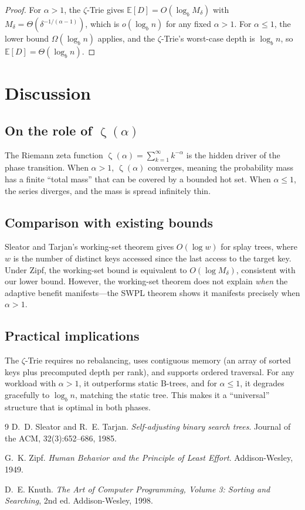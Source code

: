 \documentclass[11pt]{article}
\newcommand{\E}{\mathbb{E}}
\DeclareMathOperator{\Zeta}{\zeta}
\begin{document}
\begin{proof}
For $\alpha>1$, the $\zeta$-Trie gives $\E[D] = O(\log_b M_δ)$ with
$M_δ = Θ(δ^{-1/(\alpha-1)})$, which is $o(\log_b n)$ for any fixed $α>1$.
For $\alpha\le1$, the lower bound $\Omega(\log_b n)$ applies, and the
$\zeta$-Trie's worst-case depth is $\log_b n$, so
$\E[D] = \Theta(\log_b n)$.
\end{proof}

\section{Discussion}

\subsection{On the role of $\Zeta(\alpha)$}

The Riemann zeta function $\Zeta(\alpha) = \sum_{k=1}^\infty k^{-\alpha}$ is
the hidden driver of the phase transition.  When $\alpha>1$, $\Zeta(\alpha)$
converges, meaning the probability mass has a finite ``total mass'' that can
be covered by a bounded hot set.  When $\alpha\le1$, the series diverges,
and the mass is spread infinitely thin.

\subsection{Comparison with existing bounds}

Sleator and Tarjan's working-set theorem \cite{sleator85} gives
$O(\log w)$ for splay trees, where $w$ is the number of distinct keys
accessed since the last access to the target key.  Under Zipf, the
working-set bound is equivalent to $O(\log M_δ)$, consistent with our
lower bound.  However, the working-set theorem does not explain
\emph{when} the adaptive benefit manifests---the SWPL theorem shows
it manifests precisely when $\alpha>1$.

\subsection{Practical implications}

The $\zeta$-Trie requires no rebalancing, uses contiguous memory (an
array of sorted keys plus precomputed depth per rank), and supports
ordered traversal.  For any workload with $\alpha>1$, it outperforms
static B-trees, and for $\alpha\le1$, it degrades gracefully to
$\log_b n$, matching the static tree.  This makes it a ``universal''
structure that is optimal in both phases.


\begin{thebibliography}{9}
D.~D. Sleator and R.~E. Tarjan.
\emph{Self-adjusting binary search trees}.
Journal of the ACM, 32(3):652--686, 1985.

G.~K. Zipf.
\emph{Human Behavior and the Principle of Least Effort}.
Addison-Wesley, 1949.

D.~E. Knuth.
\emph{The Art of Computer Programming, Volume 3: Sorting and Searching},
2nd ed. Addison-Wesley, 1998.
\end{thebibliography}
\end{document}
